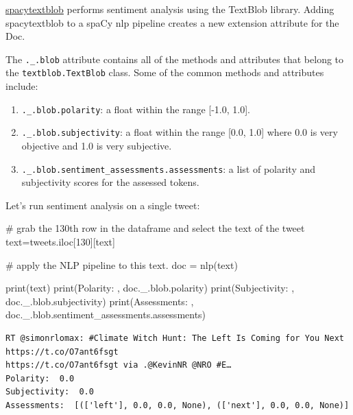 \documentclass[
  letterpaper,
  DIV=11,
  numbers=noendperiod]{scrreprt}
\newenvironment{Shaded}{\begin{snugshade}}{\end{snugshade}}
\newcommand{\BuiltInTok}[1]{\textcolor[rgb]{0.00,0.23,0.31}{#1}}
\newcommand{\CommentTok}[1]{\textcolor[rgb]{0.37,0.37,0.37}{#1}}
\newcommand{\DecValTok}[1]{\textcolor[rgb]{0.68,0.00,0.00}{#1}}
\newcommand{\NormalTok}[1]{\textcolor[rgb]{0.00,0.23,0.31}{#1}}
\newcommand{\OperatorTok}[1]{\textcolor[rgb]{0.37,0.37,0.37}{#1}}
\newcommand{\StringTok}[1]{\textcolor[rgb]{0.13,0.47,0.30}{#1}}
\providecommand{\tightlist}{%
  \setlength{\itemsep}{0pt}\setlength{\parskip}{0pt}}\usepackage{longtable,booktabs,array}
\begin{document}
\href{https://spacytextblob.netlify.app/}{spacytextblob} performs
sentiment analysis using the TextBlob library. Adding spacytextblob to a
spaCy nlp pipeline creates a new extension attribute for the Doc.

The \texttt{.\_.blob} attribute contains all of the methods and
attributes that belong to the \texttt{textblob.TextBlob} class. Some of
the common methods and attributes include:

\begin{enumerate}
\def\labelenumi{\arabic{enumi}.}
\tightlist
\item
  \texttt{.\_.blob.polarity}: a float within the range {[}-1.0, 1.0{]}.
\item
  \texttt{.\_.blob.subjectivity}: a float within the range {[}0.0,
  1.0{]} where 0.0 is very objective and 1.0 is very subjective.
\item
  \texttt{.\_.blob.sentiment\_assessments.assessments}: a list of
  polarity and subjectivity scores for the assessed tokens.
\end{enumerate}

Let's run sentiment analysis on a single tweet:

\begin{Shaded}
\begin{Highlighting}[]
\CommentTok{\# grab the 130th row in the dataframe and select the text of the tweet}
\NormalTok{text}\OperatorTok{=}\NormalTok{tweets.iloc[}\DecValTok{130}\NormalTok{][}\StringTok{\textquotesingle{}text\textquotesingle{}}\NormalTok{]}

\CommentTok{\# apply the NLP pipeline to this text.}
\NormalTok{doc }\OperatorTok{=}\NormalTok{ nlp(text)}

\BuiltInTok{print}\NormalTok{(text)}
\BuiltInTok{print}\NormalTok{(}\StringTok{\textquotesingle{}Polarity: \textquotesingle{}}\NormalTok{, doc.\_.blob.polarity)}
\BuiltInTok{print}\NormalTok{(}\StringTok{\textquotesingle{}Subjectivity: \textquotesingle{}}\NormalTok{, doc.\_.blob.subjectivity)}
\BuiltInTok{print}\NormalTok{(}\StringTok{\textquotesingle{}Assessments: \textquotesingle{}}\NormalTok{, doc.\_.blob.sentiment\_assessments.assessments)}
\end{Highlighting}
\end{Shaded}

\begin{verbatim}
RT @simonrlomax: #Climate Witch Hunt: The Left Is Coming for You Next https://t.co/O7ant6fsgt
https://t.co/O7ant6fsgt via .@KevinNR @NRO #E…
Polarity:  0.0
Subjectivity:  0.0
Assessments:  [(['left'], 0.0, 0.0, None), (['next'], 0.0, 0.0, None)]
\end{verbatim}
\end{document}
